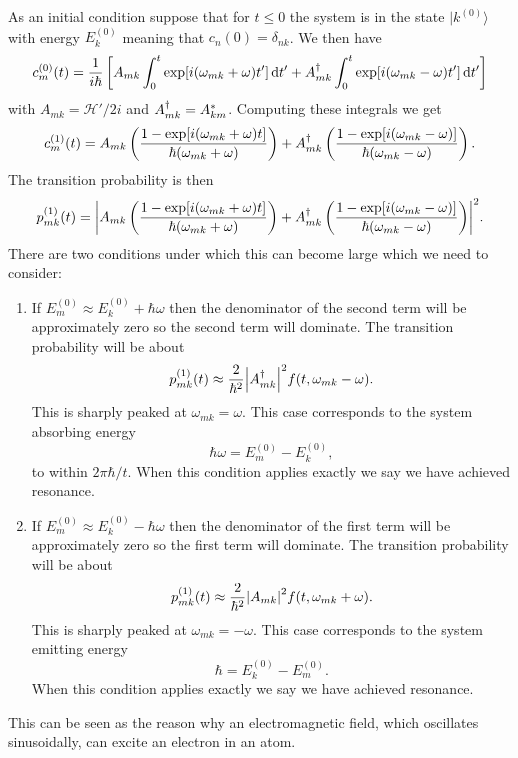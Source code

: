 \documentclass[a4paper]{article}
\renewcommand{\ket}[1]{\vert {#1} \rangle}
\begin{document}
    As an initial condition suppose that for \(t \le 0\) the system is in the state \(\ket{k^{(0)}}\) with energy \(E_k^{(0)}\) meaning that \(c_n(0) = \delta_{nk}\).
    We then have
    \[c_m^{(0)}(t) = \frac{1}{i\hbar}\left[ A_{mk}\int_0^t \exp[i(\omega_{mk} + \omega)t']\dd{t'} + A_{mk}^\dagger \int_0^t \exp[i(\omega_{mk} - \omega)t']\dd{t'} \right]\]
    with \(A_{mk} = \mathscr{H}'/2i\) and \(A_{mk}^\dagger = A_{km}^*\).
    Computing these integrals we get
    \[c_m^{(1)}(t) = A_{mk}\left( \frac{1 - \exp[i(\omega_{mk} + \omega)t]}{\hbar(\omega_{mk} + \omega)} \right) + A_{mk}^\dagger \left( \frac{1 - \exp[i(\omega_{mk} - \omega)]}{\hbar(\omega_{mk} - \omega)} \right).\]
    The transition probability is then
    \[p_{mk}^{(1)}(t) = \abs{A_{mk}\left( \frac{1 - \exp[i(\omega_{mk} + \omega)t]}{\hbar(\omega_{mk} + \omega)} \right) + A_{mk}^\dagger \left( \frac{1 - \exp[i(\omega_{mk} - \omega)]}{\hbar(\omega_{mk} - \omega)} \right)}^2.\]
    There are two conditions under which this can become large which we need to consider:
    \begin{enumerate}
        \item If \(E_m^{(0)} \approx E_k^{(0)} + \hbar\omega\) then the denominator of the second term will be approximately zero so the second term will dominate.
        The transition probability will be about
        \[p_{mk}^{(1)}(t) \approx \frac{2}{\hbar^2}\abs{A^\dagger_{mk}}^2 f(t, \omega_{mk} - \omega).\]
        This is sharply peaked at \(\omega_{mk} = \omega\).
        This case corresponds to the system absorbing energy
        \[\hbar\omega = E_m^{(0)} - E_k^{(0)},\]
        to within \(2\pi\hbar/t\).
        When this condition applies exactly we say we have achieved resonance.
        
        \item If \(E_m^{(0)} \approx E_k^{(0)} - \hbar\omega\) then the denominator of the first term will be approximately zero so the first term will dominate.
        The transition probability will be about
        \[p_{mk}^{(1)}(t) \approx \frac{2}{\hbar^2} \abs{A_{mk}}^2 f(t, \omega_{mk} + \omega).\]
        This is sharply peaked at \(\omega_{mk} = -\omega\).
        This case corresponds to the system emitting energy
        \[\hbar = E_k^{(0)} - E_m^{(0)}.\]
        When this condition applies exactly we say we have achieved resonance.
    \end{enumerate}
    This can be seen as the reason why an electromagnetic field, which oscillates sinusoidally, can excite an electron in an atom.
    
\end{document}
